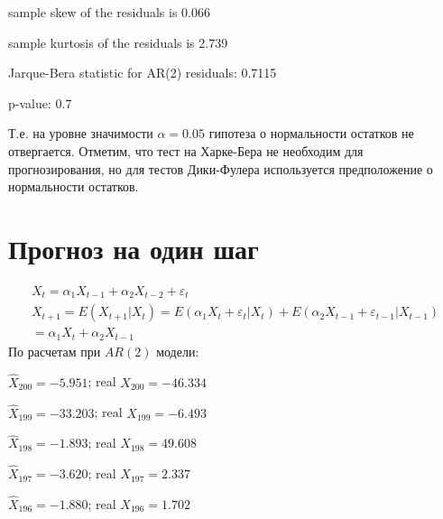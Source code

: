\documentclass{article}
\begin{document}
sample skew of the residuals is 0.066

sample kurtosis of the residuals is 2.739

Jarque-Bera statistic for AR(2) residuals: 0.7115

p-value: 0.7\newline

Т.е. на уровне значимости $\alpha=0.05$ гипотеза о нормальности остатков не отвергается. Отметим, что тест на Харке-Бера не необходим для прогнозирования, но для тестов Дики-Фулера используется предположение о нормальности остатков.\newpage

\section{Прогноз на один шаг}
\begin{gather*}
    X_t = \alpha_1X_{t-1}+\alpha_2X_{t-2} + \varepsilon_t\\
    X_{t+1}=E(X_{t+1}|X_{t})= E(\alpha_1X_{t}+\varepsilon_t|X_{t})+E(\alpha_2X_{t-1}+\varepsilon_{t-1}|X_{t-1})\\
    =\alpha_1X_{t}+\alpha_2X_{t-1}
\end{gather*}
По расчетам при $AR(2)$ модели:\newline

$\hat{X}_{200} = -5.951$; real $X_{200} = -46.334$

$\hat{X}_{199} = -33.203$;	real $X_{199} = -6.493$

$\hat{X}_{198} = -1.893$;	real $X_{198} = 49.608$

$\hat{X}_{197} = -3.620$;	real $X_{197} = 2.337$

$\hat{X}_{196} = -1.880$;	real $X_{196} = 1.702$
\end{document}
